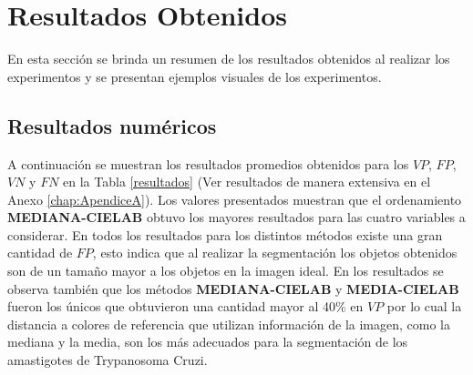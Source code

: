 \section{Resultados Obtenidos}
\label{chap:resultados}

En esta sección se brinda un resumen de los resultados obtenidos al realizar los experimentos y se presentan ejemplos visuales de los experimentos.

\subsection{Resultados numéricos}

A continuación se muestran los resultados promedios obtenidos para los $VP$, $FP$, $VN$ y $FN$ en la Tabla \ref{resultados} (Ver resultados de manera extensiva en el Anexo \ref{chap:ApendiceA}). Los valores presentados muestran que el ordenamiento \textbf{MEDIANA-CIELAB} obtuvo los mayores resultados para las cuatro variables a considerar. En todos los resultados para los distintos métodos existe una gran cantidad de $FP$, esto indica que al realizar la segmentación los objetos obtenidos son de un tamaño mayor a los objetos en la imagen ideal. En los resultados se observa también que los métodos \textbf{MEDIANA-CIELAB} y \textbf{MEDIA-CIELAB} fueron los únicos que obtuvieron una cantidad mayor al 40\% en $VP$ por lo cual la distancia a colores de referencia que utilizan información de la imagen, como la mediana y la media, son los más adecuados para la segmentación de los amastigotes de Trypanosoma Cruzi.

